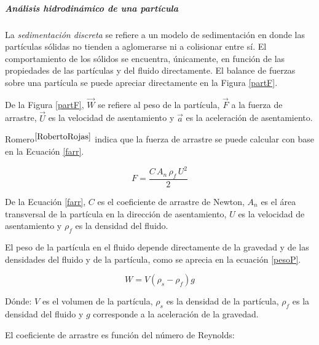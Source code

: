 \subparagraph{An\'alisis hidrodin\'amico de una part\'icula} \label{hidroD}

\noindent
\justify

La \textit{sedimentaci\'on discreta} se refiere a un modelo de sedimentaci\'on en donde las part\'iculas s\'olidas no tienden a aglomerarse ni a colisionar entre s\'i. El comportamiento de los s\'olidos se encuentra, \'unicamente, en funci\'on de las propiedades de las part\'iculas y del fluido directamente. El balance de fuerzas sobre una part\'icula se puede apreciar directamente en la Figura \ref{partF}.



\noindent
\justify


De la Figura \ref{partF}, $\vec{W}$ se refiere al peso de la part\'icula, $\vec{F}$ a la fuerza de arrastre, $\vec{U}$ es la velocidad de asentamiento y $\vec{a}$ es la aceleraci\'on de asentamiento.

\noindent
\justify

Romero$^{\cite{RobertoRojas}}$ indica que la fuerza de arrastre se puede calcular con base en la Ecuaci\'on \ref{farr}.

\begin{equation}
	F = \frac{C \, A_n \, \rho _f \, U^2}{2}
	\label{farr}
\end{equation}

\noindent
\justify

De la Ecuaci\'on \ref{farr}, $C$ es el coeficiente de arrastre de Newton, $A_n$ es el \'area transversal de la part\'icula en la direcci\'on de asentamiento, $U$ es la velocidad de asentamiento y $\rho _f$ es la densidad del fluido.

\noindent
\justify

El peso de la part\'icula en el fluido depende directamente de la gravedad y de las densidades del fluido y de la part\'icula, como se aprecia en la ecuaci\'on \ref{pesoP}.

\begin{equation}
	W = V \left(\rho _s - \rho _f \right) g
	\label{pesoP}
\end{equation}

\noindent
\justify

D\'onde: $V$ es el volumen de la part\'icula, $\rho _s$ es la densidad de la part\'icula, $\rho _f$ es la densidad del fluido y $g$ corresponde a la aceleraci\'on de la gravedad.

\noindent
\justify

El coeficiente de arrastre es funci\'on del n\'umero de Reynolds:

